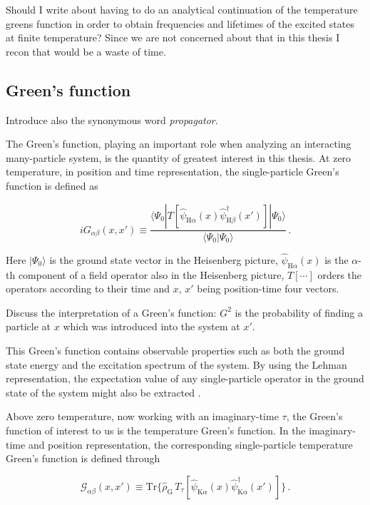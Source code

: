 \documentclass[12pt]{report}
\newcommand{\Gt}{\mathcal{G}}
\newcommand{\question}[1]{{\leavevmode\color{question}#1}}
\newcommand{\todo}[1]{{\leavevmode\color{todo}#1}}
\begin{document}
\question{Should I write about having to do an analytical continuation of the temperature greens function in order to obtain frequencies and lifetimes of the excited states at finite temperature? Since we are not concerned about that in this thesis I recon that would be a waste of time.}


\subsection{Green's function}

\todo{Introduce also the synonymous word \textit{propagator}.}

The Green's function, playing an important role when analyzing an interacting many-particle system, is the quantity of greatest interest in this thesis. At zero temperature, in position and time representation, the single-particle Green's function is defined as

\begin{equation}
	i G_{\alpha \beta} (x, x')
	\equiv \frac{\langle \Psi_0 | T[\hat \psi_{\text{H} \alpha} (x) \hat \psi^\dagger_{\text{H} \beta} (x')] |\Psi_0 \rangle}{\langle \Psi_0 |\Psi_0 \rangle} \,.
\end{equation}

Here $ | \Psi_0 \rangle $ is the ground state vector in the Heisenberg picture, $ \hat \psi_{\text{H} \alpha}(x) $ is the $ \alpha $-th component of a field operator also in the Heisenberg picture, $ T[ \cdots ] $ orders the operators according to their time and $ x $, $ x' $ being position-time four vectors.

\todo{Discuss the interpretation of a Green's function: $ G^2 $ is the probability of finding a particle at $ x $ which was introduced into the system at $ x' $.}

This Green's function contains observable properties such as both the ground state energy and the excitation spectrum of the system.  By using the Lehman representation, the expectation value of any single-particle operator in the ground state of the system might also be extracted \cite{quantumTheoryOfManyParticleSystems}.

Above zero temperature, now working with an imaginary-time $ \tau $, the Green's function of interest to us is the temperature Green's function. In the imaginary-time and position representation, the corresponding single-particle temperature Green's function is defined through

\begin{equation}
	\Gt_{\alpha \beta} (x, x')
	\equiv \text{Tr} \{ \hat \rho_\text{G} \, T_\tau [\hat \psi_{\text{K} \alpha}(x) \hat \psi^\dagger_{\text{K} \alpha}(x') ] \} \,.
\end{equation}
\end{document}
